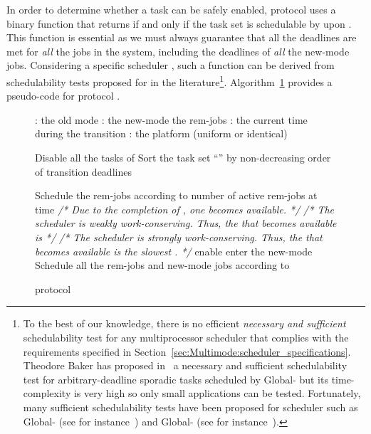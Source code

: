 \documentclass{article}
\newtheorem{validity test}{Validity Test}
\begin{document}
In order to determine whether a task can be safely enabled, protocol  uses a binary function  that returns  if and only if the task set  is schedulable by  upon . This function is essential as we must always guarantee that all the deadlines are met for \emph{all} the jobs in the system, including the deadlines of \emph{all} the new-mode jobs. Considering a specific scheduler , such a function can be derived from schedulability tests proposed for  in the literature\footnote{To the best of our knowledge, there is no efficient \emph{necessary and sufficient} schedulability test for any multiprocessor scheduler that complies with the requirements specified in Section~\ref{sec:Multimode:scheduler_specifications}. Theodore Baker has proposed in~\cite{Baker:07} a necessary and sufficient schedulability test for arbitrary-deadline sporadic tasks scheduled by Global- but its time-complexity is very high so only small applications can be tested. Fortunately, many sufficient schedulability tests have been proposed for scheduler such as Global- (see for instance~\cite{BakerBaruah:09,Baruah:10,BaruahGoossens:08,BaruahBaker:08,BertCiriLipari:05}) and Global- (see for instance~\cite{Baker:03,BaruahGoossens:08:2,BaruahFisher:07}).}. Algorithm~\ref{algo:AMMSO} provides a pseudo-code for protocol .

\begin{figure}
\begin{center}
\begin{minipage}{15cm}
\begin{algorithmic}[1]
\REQUIRE : the old mode
\REQUIRE : the new-mode
\REQUIRE the rem-jobs
\REQUIRE : the current time during the transition
\REQUIRE : the platform (uniform or identical)

 \STATE Disable all the tasks of 
 \STATE Sort the task set ``'' by non-decreasing order of transition deadlines
 \STATE  
\ENDIF

\STATE Schedule the rem-jobs according to 
	\STATE  number of active rem-jobs at time 	
	\IF{()}		
		\STATE \textit{/* Due to the completion of , one   becomes available. */}
			\STATE \textit{/* The scheduler is weakly work-conserving. Thus, the  that becomes available is  */}
			\STATE 
		\ELSE
			\STATE \textit{/* The scheduler is strongly work-conserving. Thus, the  that becomes available is the  slowest . */}
			\STATE 
		\ENDIF
	\ENDIF
		\STATE 
		\IF{()}
    			\STATE enable 
		\ENDIF
	\ENDFOR
	\IF{()}
		\STATE enter the new-mode 
	\ELSE
		\STATE Schedule all the rem-jobs and new-mode jobs according to 
  	\ENDIF
\ENDIF
\end{algorithmic}
\end{minipage}
\end{center}
\caption{ protocol}
\label{algo:AMMSO}
\end{figure}
\end{document}
